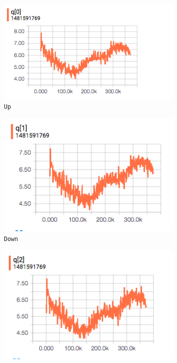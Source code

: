 \documentclass[9pt,journal]{IEEEtran}
\begin{document}
\begin{figure}[ht]
  \begin{subfigure}{0.19\textwidth}
    \includegraphics[width=1\textwidth]{report/TG2D-H_action_q/q0}
    \caption*{\texttt{Up}}
    \centering
  \end{subfigure}
  \begin{subfigure}{0.19\textwidth}
    \includegraphics[width=1\textwidth]{report/TG2D-H_action_q/q1}
    \caption*{\texttt{Down}}
    \centering
  \end{subfigure}
  \begin{subfigure}{0.19\textwidth}
    \includegraphics[width=1\textwidth]{report/TG2D-H_action_q/q2}

\end{subfigure}
\end{figure}
\end{document}
